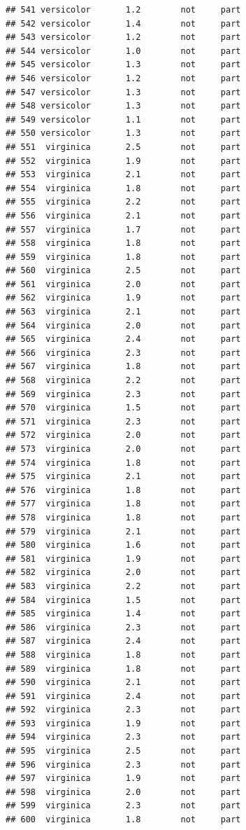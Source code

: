 \documentclass[krantz2]{krantz}\usepackage{knitr}%
\begin{document}
\begin{knitrout}
\begin{kframe}
\begin{verbatim}
## 541 versicolor       1.2        not     part
## 542 versicolor       1.4        not     part
## 543 versicolor       1.2        not     part
## 544 versicolor       1.0        not     part
## 545 versicolor       1.3        not     part
## 546 versicolor       1.2        not     part
## 547 versicolor       1.3        not     part
## 548 versicolor       1.3        not     part
## 549 versicolor       1.1        not     part
## 550 versicolor       1.3        not     part
## 551  virginica       2.5        not     part
## 552  virginica       1.9        not     part
## 553  virginica       2.1        not     part
## 554  virginica       1.8        not     part
## 555  virginica       2.2        not     part
## 556  virginica       2.1        not     part
## 557  virginica       1.7        not     part
## 558  virginica       1.8        not     part
## 559  virginica       1.8        not     part
## 560  virginica       2.5        not     part
## 561  virginica       2.0        not     part
## 562  virginica       1.9        not     part
## 563  virginica       2.1        not     part
## 564  virginica       2.0        not     part
## 565  virginica       2.4        not     part
## 566  virginica       2.3        not     part
## 567  virginica       1.8        not     part
## 568  virginica       2.2        not     part
## 569  virginica       2.3        not     part
## 570  virginica       1.5        not     part
## 571  virginica       2.3        not     part
## 572  virginica       2.0        not     part
## 573  virginica       2.0        not     part
## 574  virginica       1.8        not     part
## 575  virginica       2.1        not     part
## 576  virginica       1.8        not     part
## 577  virginica       1.8        not     part
## 578  virginica       1.8        not     part
## 579  virginica       2.1        not     part
## 580  virginica       1.6        not     part
## 581  virginica       1.9        not     part
## 582  virginica       2.0        not     part
## 583  virginica       2.2        not     part
## 584  virginica       1.5        not     part
## 585  virginica       1.4        not     part
## 586  virginica       2.3        not     part
## 587  virginica       2.4        not     part
## 588  virginica       1.8        not     part
## 589  virginica       1.8        not     part
## 590  virginica       2.1        not     part
## 591  virginica       2.4        not     part
## 592  virginica       2.3        not     part
## 593  virginica       1.9        not     part
## 594  virginica       2.3        not     part
## 595  virginica       2.5        not     part
## 596  virginica       2.3        not     part
## 597  virginica       1.9        not     part
## 598  virginica       2.0        not     part
## 599  virginica       2.3        not     part
## 600  virginica       1.8        not     part
\end{verbatim}
\end{kframe}
\end{knitrout}
\end{document}
